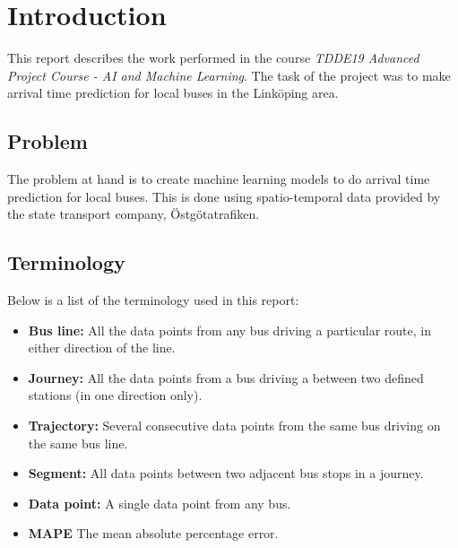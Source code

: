 


\chapter{Introduction}
\label{cha:introduction}
This report describes the work performed in the course \textit{TDDE19 Advanced Project Course - AI and Machine Learning}. The task of the project was to make arrival time prediction for local buses in the Link\"oping area.

\section{Problem}
\label{sec:problem}
The problem at hand is to create machine learning models to do arrival time prediction for local buses. This is done using spatio-temporal data provided by the state transport company, \"Ostg\"otatrafiken.

\section{Terminology}
\label{sec:terminology}
Below is a list of the terminology used in this report:
\begin{itemize}
\item \textbf{Bus line:} All the data points from any bus driving a particular route, in either direction of the line.
\item \textbf{Journey:} All the data points from a bus driving a between two defined stations (in one direction only).
\item \textbf{Trajectory:} Several consecutive data points from the same bus driving on the same bus line.
\item \textbf{Segment:} All data points between two adjacent bus stops in a journey.
\item \textbf{Data point:} A single data point from any bus.
\\
\item \textbf{MAPE} The mean absolute percentage error.
\end{itemize}

